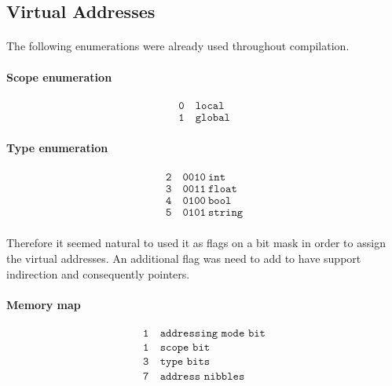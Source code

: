 \newpage

\subsection{Virtual Addresses}

\paragraph{} The following enumerations were already used throughout
compilation.

\paragraph{Scope enumeration}

\begin{align*}
    \texttt{0} &\ \texttt{local}\\
    \texttt{1} &\ \texttt{global}
\end{align*}

\paragraph{Type enumeration}

\begin{align*}
    \texttt{2} &\ \texttt{0010}\ \texttt{int}\\
    \texttt{3} &\ \texttt{0011}\ \texttt{float}\\
    \texttt{4} &\ \texttt{0100}\ \texttt{bool}\\
    \texttt{5} &\ \texttt{0101}\ \texttt{string}
\end{align*}

\paragraph{} Therefore it seemed natural to used it as flags on a bit mask
in order to assign the virtual addresses. An additional flag was need to add
to have support indirection and consequently pointers.

\paragraph{Memory map}

\begin{align*}
    \texttt{1} &\ \texttt{addressing mode bit}\\
    \texttt{1} &\ \texttt{scope bit}\\
    \texttt{3} &\ \texttt{type bits}\\
    \texttt{7} &\ \texttt{address nibbles}
\end{align*}

